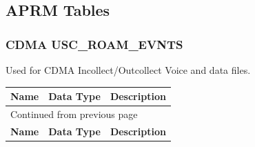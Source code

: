 \documentclass[12pt,twoside]{article}
\begin{document}
\subsection{APRM Tables}
\label{sec:orgheadline78}
\subsubsection{CDMA USC\_ROAM\_EVNTS}
\label{sec:orgheadline71}
Used for CDMA Incollect/Outcollect Voice and data files.
\footnotesize

\begin{longtable}{l|l|l}
\hline
\textbf{Name} & \textbf{Data Type} & \textbf{Description}\\
\hline
\endfirsthead
\multicolumn{3}{l}{Continued from previous page} \\
\hline

\textbf{Name} & \textbf{Data Type} & \textbf{Description} \\


\end{longtable}
\end{document}
